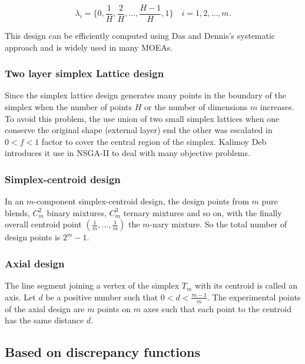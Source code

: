 \documentclass[a4paper,10pt]{llncs}
\begin{document}
\begin{equation}
 \lambda_i=\{0,\frac{1}{H},\frac{2}{H},\dots,\frac{H-1}{H},1\}\quad  i =1,2,\dots,m.
\end{equation}

This design can be efficiently computed using Das and Dennis’s systematic approach\cite{Das:1998:NIN:588907.589322} and is widely used in many MOEAs.

\subsubsection{Two layer simplex Lattice design}

Since the simplex lattice design generates many points in the boundary of the simplex when the number of points $H$ or the number of dimensions $m$ increases. To avoid this problem, the use union of two small simplex lattices when one conserve the original shape (external layer) end the other was escalated in $ 0 < f < 1$ factor to cover the central region of the simplex. Kalimoy Deb introduces it use in NSGA-II\cite{6600851} to deal with many objective problems.

\subsubsection{Simplex-centroid design}

In an $m$-component simplex-centroid design, the design points from $m$ pure blends, $C^2_m$ binary mixtures, $C^3_m$ ternary mixtures and so on, with the finally overall centroid point $(\frac{1}{m} ,\dots ,\frac{1}{m})$ the $m$-nary mixture. So the total number of design points is
$2^m-1$.

\subsubsection{Axial design}

The line segment joining a vertex of the simplex $T_m$ with its centroid is called an axis. Let $d$ be a positive number such that $0 < d < \frac{m-1}{m}$. The experimental points of the axial design are $m$ points on $m$ axes such that each point to the centroid has the same distance $d$.


\subsection{Based on discrepancy functions} %
\end{document}
